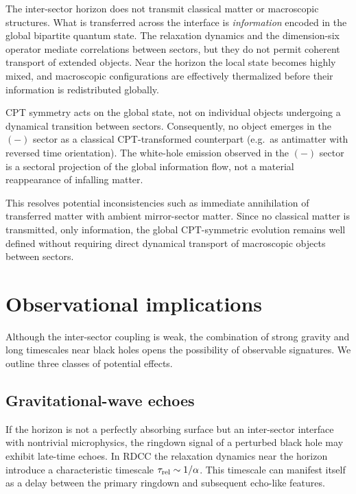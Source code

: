 \documentclass[11pt,a4paper]{article}
\begin{document}
The inter-sector horizon does not transmit classical matter or macroscopic structures. What
is transferred across the interface is \emph{information} encoded in the global bipartite quantum
state. The relaxation dynamics and the dimension-six operator mediate correlations between
sectors, but they do not permit coherent transport of extended objects. Near the horizon the
local state becomes highly mixed, and macroscopic configurations are effectively thermalized
before their information is redistributed globally.

CPT symmetry acts on the global state, not on individual objects undergoing a dynamical
transition between sectors. Consequently, no object emerges in the $(-)$ sector as a classical
CPT-transformed counterpart (e.g.\ as antimatter with reversed time orientation). The white-hole
emission observed in the $(-)$ sector is a sectoral projection of the global information flow, not
a material reappearance of infalling matter.

This resolves potential inconsistencies such as immediate annihilation of transferred matter
with ambient mirror-sector matter. Since no classical matter is transmitted, only information,
the global CPT-symmetric evolution remains well defined without requiring direct dynamical
transport of macroscopic objects between sectors.


\section{Observational implications}

Although the inter-sector coupling is weak, the combination of strong gravity and long timescales 
near black holes opens the possibility of observable signatures. We outline three classes of 
potential effects.

\subsection{Gravitational-wave echoes}

If the horizon is not a perfectly absorbing surface but an inter-sector interface with nontrivial 
microphysics, the ringdown signal of a perturbed black hole may exhibit late-time echoes. 
In RDCC the relaxation dynamics near the horizon introduce a characteristic timescale 
\(\tau_{\rm rel} \sim 1/\alpha\). This timescale can manifest itself as a delay between the primary 
ringdown and subsequent echo-like features.
\end{document}
